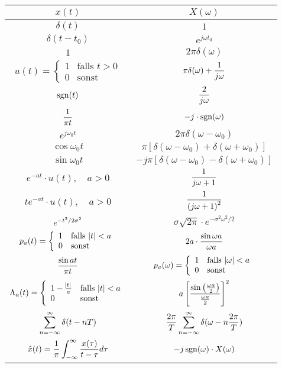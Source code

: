 \documentclass[a4paper]{article}
\begin{document}
\begin{twocolumn}
\begin{tabular}{cc}
  $x(t)$ & $X(\omega)$ \\
  \toprule 
  $\delta(t)$ & $1$ \\
  $\delta(t-t_0)$ & $e^{j \omega t_0}$ \\
  $1$ & $2 \pi \delta(\omega)$ \\
  $u(t) = \left\{ \begin{array}{ll} 1 & \text{falls } t > 0 \\ 0 & \text{sonst} \end{array} \right.$ & $\displaystyle \pi \delta(\omega) + \frac{1}{j\omega}$ \\
  $\operatorname{sgn}(t)$ & $\displaystyle \frac{2}{j\omega}$ \\
  $\displaystyle \frac{1}{\pi t}$ & $-j \cdot \operatorname{sgn}(\omega)$ \\
  $e^{j \omega_0 t}$ & $2 \pi \delta(\omega - \omega_0)$ \\
  $\cos \omega_0 t$ & $\pi \left[ \delta(\omega - \omega_0) + \delta(\omega + \omega_0) \right]$ \\
  $\sin \omega_0 t$ & $-j \pi \left[ \delta(\omega - \omega_0) - \delta(\omega + \omega_0) \right]$ \\
  $e^{-a t} \cdot u(t), \quad a > 0$ & $\displaystyle \frac{1}{j \omega + 1}$ \\
  $t e^{-a t} \cdot u(t), \quad a > 0$ & $\displaystyle \frac{1}{\left( j \omega + 1 \right)^2}$ \\
  $\displaystyle e^{-t^2 / 2\sigma^2 }$ & $\sigma \sqrt{2\pi} \cdot e^{-\sigma^2 \omega^2 / 2}$ \\
  $p_a(t) = \left\{ \begin{array}{ll} 1 & \text{falls } \abs{t} < a \\ 0 & \text{sonst} \end{array} \right.$ & $\displaystyle 2a \cdot \frac{\sin \omega a}{\omega a}$ \\
  $\displaystyle \frac{\sin at}{\pi t}$ & $p_a(\omega) = \left\{ \begin{array}{ll} 1 & \text{falls } \abs{\omega} < a \\ 0 & \text{sonst} \end{array} \right.$ \\
  $\Lambda_a(t) = \left\{ \begin{array}{ll} 1 - \frac{\abs{t}}{a} & \text{falls } \abs{t} < a \\ 0 & \text{sonst} \end{array} \right.$ & $\displaystyle a \left[ \frac{\sin \left(\frac{\omega a}{2}\right)}{\frac{\omega a}{2}} \right]^2$ \\
  $\displaystyle \sum_{n = -\infty}^{\infty} \delta(t - nT)$ & $\displaystyle \frac{2\pi}{T} \sum_{n = -\infty}^{\infty} \delta(\omega - n \frac{2\pi}{T})$ \\
  $\displaystyle \hat{x}(t) = \frac{1}{\pi} \int_{-\infty}^\infty \frac{x(\tau)}{t - \tau}d \tau$ & $-j \operatorname{sgn}(\omega) \cdot X(\omega)$ \\
\end{tabular}


\end{twocolumn}
\end{document}
